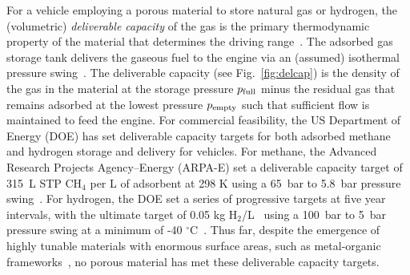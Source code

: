 

For a vehicle employing a porous material to store natural gas or hydrogen, the (volumetric) \emph{deliverable capacity} of the gas is the primary thermodynamic property of the material that determines the driving range~\cite{mason2014evaluating}. The adsorbed gas storage tank delivers the gaseous fuel to the engine via an (assumed) isothermal pressure swing~\cite{sircar2002pressure}. The deliverable capacity (see Fig.~\ref{fig:delcap}) is the density of the gas in the material at the storage pressure $p_{\text{full}}$ minus the residual gas that remains adsorbed at the lowest pressure $p_{\text{empty}}$ such that sufficient flow is maintained to feed the engine.
For commercial feasibility, the US Department of Energy (DOE) has set deliverable capacity targets for both adsorbed methane and hydrogen storage and delivery for vehicles. For methane, the Advanced Research Projects Agency--Energy (ARPA-E) set a deliverable capacity target of 315\ L STP CH$_4$ per L of adsorbent at 298 K using a 65\ bar to 5.8\ bar pressure swing~\cite{simon2015materials}. For hydrogen, the DOE set a series of progressive targets at five year intervals, with the ultimate target of 0.05 kg H$_2$/L~\cite{h2targetsDOE} using a 100\ bar to 5\ bar pressure swing at a minimum of -40 $^\circ$C~\cite{allendorf2018assessment}. Thus far, despite the emergence of highly tunable materials with enormous surface areas, such as metal-organic frameworks~\cite{furukawa2013chemistry}, no porous material has met these deliverable capacity targets. 

